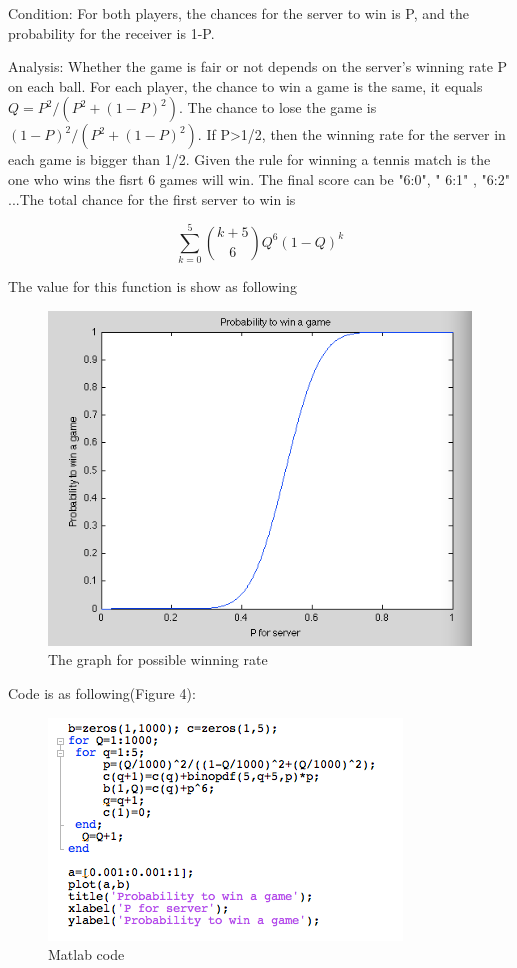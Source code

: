 \documentclass[12pt]{article}
\begin{document}
 Condition: For both players, the chances for the server to win is P, and the probability for the receiver is 1-P. 

Analysis: Whether the game is fair or not depends on the server's winning rate P on each ball. For each player, the chance to win a game is the same, it equals $Q=P^2/(P^2+(1-P)^2)$. The chance to lose the game is $(1-P)^2/(P^2+(1-P)^2)$.  If P>1/2, then the winning rate for the server in each game is bigger than 1/2. Given the rule for winning a tennis match is the one who wins the fisrt 6 games will win. The final score can be "6:0", " 6:1" , "6:2" ...The total chance for the first server to win is 


\[
 \sum_{k=0}^{5} {k+5\choose 6}{Q^6(1-Q)^k}
\]

The value for this function is show as following 

\begin{figure}[h]
    \begin{center}
        \includegraphics[scale=0.8]{graph3.png}
    \end{center}
    \caption{The graph for possible winning rate}
    \label{fig:branch}
\end{figure}

Code is as following(Figure 4):
\begin{figure}[h]
    \begin{center}
        \includegraphics{code.png}
    \end{center}
    \caption{Matlab code}
    \label{fig:branch}
\end{figure}
\end{document}
